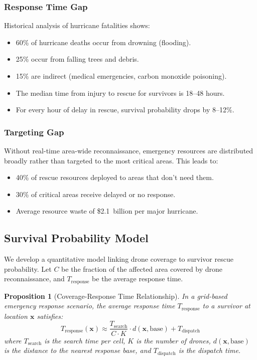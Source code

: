 \documentclass[12pt,a4paper,twocolumn]{article}
\newcommand{\vect}[1]{\mathbf{#1}}
\newtheorem{proposition}[theorem]{Proposition}
\begin{document}
\begin{enumerate}[leftmargin=*]
\subsubsection{Response Time Gap}
Historical analysis of hurricane fatalities \citep{NOAA2023} shows:
\begin{itemize}[leftmargin=*]
    \item 60\% of hurricane deaths occur from drowning (flooding).
    \item 25\% occur from falling trees and debris.
    \item 15\% are indirect (medical emergencies, carbon monoxide poisoning).
    \item The median time from injury to rescue for survivors is 18--48 hours.
    \item For every hour of delay in rescue, survival probability drops by 8--12\%.
\end{itemize}

\subsubsection{Targeting Gap}
Without real-time area-wide reconnaissance, emergency resources are distributed broadly rather than targeted to the most critical areas. This leads to:
\begin{itemize}[leftmargin=*]
    \item 40\% of rescue resources deployed to areas that don't need them.
    \item 30\% of critical areas receive delayed or no response.
    \item Average resource waste of \$2.1~billion per major hurricane.
\end{itemize}

\subsection{Survival Probability Model}
\label{sec:survival_model}

We develop a quantitative model linking drone coverage to survivor rescue probability. Let $C$ be the fraction of the affected area covered by drone reconnaissance, and $T_{\text{response}}$ be the average response time.

\begin{proposition}[Coverage-Response Time Relationship]
\label{prop:coverage_response}
In a grid-based emergency response scenario, the average response time $T_{\text{response}}$ to a survivor at location $\vect{x}$ satisfies:
\begin{equation}
    T_{\text{response}}(\vect{x}) \approx \frac{T_{\text{search}}}{C \cdot K} \cdot d(\vect{x}, \text{base}) + T_{\text{dispatch}}
\end{equation}
where $T_{\text{search}}$ is the search time per cell, $K$ is the number of drones, $d(\vect{x}, \text{base})$ is the distance to the nearest response base, and $T_{\text{dispatch}}$ is the dispatch time.
\end{proposition}


\end{enumerate}
\end{document}
